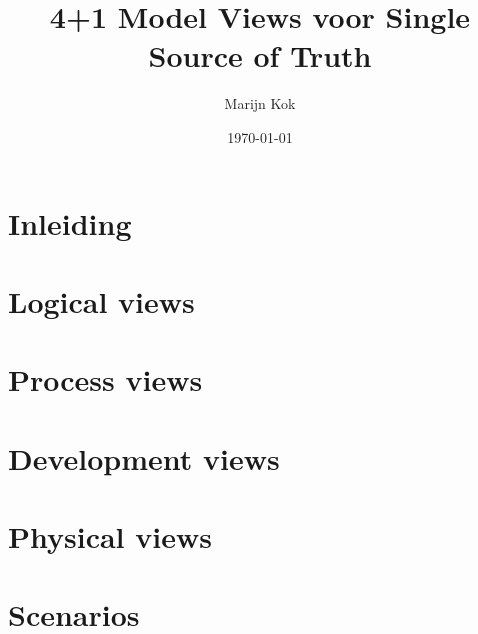 \documentclass[dutch]{article}
\title{4+1 Model Views voor Single Source of Truth}
\author{Marijn Kok}
\date{\today}
\begin{document}
\maketitle

\tableofcontents

\section{Inleiding}


\section{Logical views}


\section{Process views}


\section{Development views}


\section{Physical views}


\section{Scenarios}


\printbibliography
\end{document}
